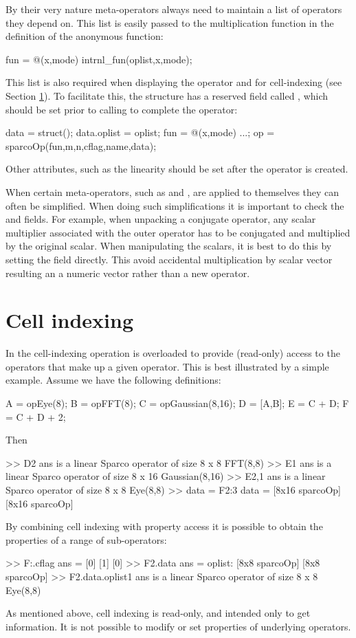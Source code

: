 By their very nature meta-operators always need to maintain a list of
operators they depend on. This list is easily passed to the
multiplication function in the definition of the anonymous function:
\begin{codeblock}
fun = @(x,mode) intrnl\_fun(oplist,x,mode);
\end{codeblock}
This list is also required when displaying the operator and for
cell-indexing (see Section \ref{Sec:CellIndexing}). To facilitate
this, the  structure has a reserved field called
, which should be set prior to calling 
to complete the operator:
\begin{codeblock}
data = struct();
data.oplist = oplist;
fun         = @(x,mode) ...;
op          = sparcoOp(fun,m,n,cflag,name,data);
\end{codeblock}
Other attributes, such as the linearity should be set after the
operator is created.

When certain meta-operators, such as  and
, are applied to themselves they can often be
simplified. When doing such simplifications it is important to check
the  and  fields. For example, when
unpacking a conjugate operator, any scalar multiplier associated with
the outer operator has to be conjugated and multiplied by the original
scalar. When manipulating the scalars, it is best to do this by
setting the  field directly. This avoid accidental
multiplication by scalar vector resulting an a numeric vector rather
than a new operator.


\section{Cell indexing}\label{Sec:CellIndexing}

In \spot{} the cell-indexing operation is overloaded to provide
(read-only) access to the operators that make up a given
operator. This is best illustrated by a simple example. Assume we have
the following definitions:
\begin{codeblock}
A = opEye(8);
B = opFFT(8);
C = opGaussian(8,16);
D = [A,B];
E = C + D;
F = C + D + 2;
\end{codeblock}
Then
\begin{codeblock}
>> D{2}
ans is a linear Sparco operator of size 8 x 8
         FFT(8,8)
>> E{1}
ans is a linear Sparco operator of size 8 x 16
         Gaussian(8,16)
>> E{2,1}
ans is a linear Sparco operator of size 8 x 8
         Eye(8,8)
>> data = F{2:3}
data =
    [8x16 sparcoOp]    [8x16 sparcoOp]
\end{codeblock}
By combining cell indexing with property access it is possible to
obtain the properties of a range of sub-operators:
\begin{codeblock}
>> F{:}.cflag
ans =
    [0]    [1]    [0]
>> F{2}.data
ans =
    oplist: {[8x8 sparcoOp]  [8x8 sparcoOp]}
>> F{2}.data.oplist{1}
ans is a linear Sparco operator of size 8 x 8
         Eye(8,8)
\end{codeblock}
As mentioned above, cell indexing is read-only, and intended only to
get information. It is not possible to modify or set properties of
underlying operators.

